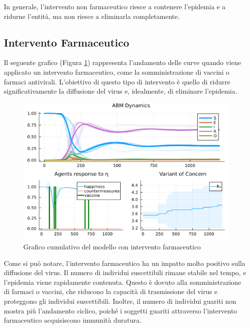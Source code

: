 In generale, l'intervento non farmaceutico riesce a contenere 
l'epidemia e a ridurne l'entità, ma non riesce a eliminarla 
completamente.

\subsection{Intervento Farmaceutico}

Il seguente grafico (Figura \ref{fig:abm_pharm_intervent}) 
rappresenta l'andamento delle curve quando viene applicato un 
intervento farmaceutico, come la somministrazione di vaccini o 
farmaci antivirali. L'obiettivo di questo tipo di intervento è 
quello di ridurre significativamente la diffusione del virus e, 
idealmente, di eliminare l'epidemia.

\begin{figure}[H]
    \begin{center}
		\includegraphics[width=\textwidth]{img/SocialNetworkABM_VACCINE.png}
		\caption{Grafico cumulativo del modello con intervento farmaceutico}
		\label{fig:abm_pharm_intervent}
	\end{center}
\end{figure}

Come si può notare, l'intervento farmaceutico ha un impatto 
molto positivo sulla diffusione del virus. Il numero di individui 
suscettibili rimane stabile nel tempo, e l'epidemia viene rapidamente 
contenuta. Questo è dovuto alla somministrazione di farmaci o vaccini, 
che riducono la capacità di trasmissione del virus e proteggono gli 
individui suscettibili. Inoltre, il numero di individui guariti non 
mostra più l'andamento ciclico, poiché i soggetti guariti attraverso 
l'intervento farmaceutico acquisiscono immunità duratura.

